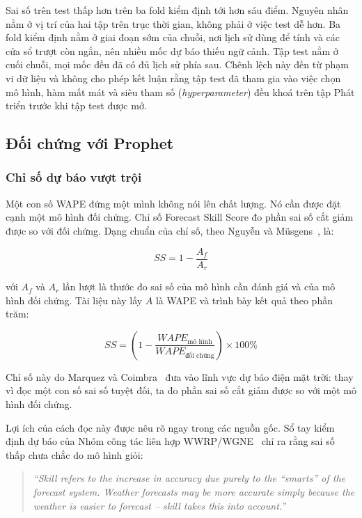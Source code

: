 Sai số trên test thấp hơn trên ba fold kiểm định tới hơn sáu điểm. Nguyên nhân nằm ở vị trí của
hai tập trên trục thời gian, không phải ở việc test dễ hơn. Ba fold kiểm định nằm ở giai đoạn
sớm của chuỗi, nơi lịch sử dùng để tính  và các cửa sổ trượt còn ngắn, nên
nhiều mốc dự báo thiếu ngữ cảnh. Tập test nằm ở cuối chuỗi, mọi mốc đều đã có đủ lịch
sử phía sau. Chênh lệch này đến từ phạm vi dữ liệu và không cho phép kết luận rằng tập test đã
tham gia vào việc chọn mô hình, hàm mất mát và siêu tham số (\textit{hyperparameter}) đều khoá trên tập Phát triển
trước khi tập test được mở.

\FloatBarrier
\subsection{Đối chứng với Prophet}

\subsubsection{Chỉ số dự báo vượt trội}

Một con số WAPE đứng một mình không nói lên chất lượng. Nó cần được đặt cạnh một mô hình đối
chứng. Chỉ số Forecast Skill Score đo phần sai số cắt giảm được so với đối chứng. Dạng chuẩn của
chỉ số, theo Nguyễn và Müsgens~\cite{nguyen2026meta}, là:

\begin{equation}
\label{eq:ss_tong_quat}
SS = 1 - \frac{A_f}{A_r}
\end{equation}

với $A_f$ và $A_r$ lần lượt là thước đo sai số của mô hình cần đánh giá và của mô hình đối
chứng. Tài liệu này lấy $A$ là WAPE và trình bày kết quả theo phần trăm:

\begin{equation}
\label{eq:ss_wape}
SS = \left(1 - \frac{WAPE_{\text{mô hình}}}{WAPE_{\text{đối chứng}}}\right) \times 100\%
\end{equation}

Chỉ số này do Marquez và Coimbra~\cite{marquez2013skill} đưa vào lĩnh vực dự báo điện mặt trời:
thay vì đọc một con số sai số tuyệt đối, ta đo phần sai số cắt giảm được so với một mô hình đối
chứng.

Lợi ích của cách đọc này được nêu rõ ngay trong các nguồn gốc. Sổ tay kiểm định dự báo của Nhóm công
tác liên hợp WWRP/WGNE~\cite{wwrp2009verif} chỉ ra rằng sai số thấp chưa chắc do mô hình giỏi:

\begin{quote}\small
\textit{``Skill refers to the increase in accuracy due purely to the ``smarts'' of the forecast
system. Weather forecasts may be more accurate simply because the weather is easier to forecast
-- skill takes this into account.''}
\end{quote}

